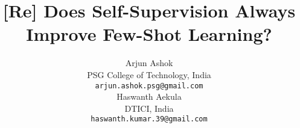 \documentclass{article}[12pt]
\title{[Re] Does Self-Supervision Always Improve Few-Shot Learning?}
\author{%
  Arjun Ashok \\
  PSG College of Technology, India \\
  \texttt{arjun.ashok.psg@gmail.com} \\
  \And
  Haswanth Aekula \\
  DTICI, India \\
  \texttt{haswanth.kumar.39@gmail.com} \\
}
\begin{document}
\maketitle

{


}

\end{document}
